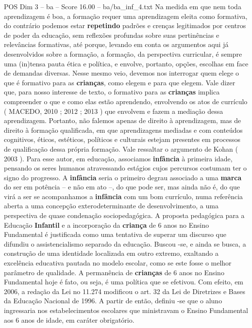 \begin{textsample}{POS Dim 3 – ba – Score 16.00 – ba/ba\_inf\_4.txt}
Na medida em que nem toda aprendizagem é boa, a formação requer uma aprendizagem eleita como formativa, do contrário podemos estar \textbf{repetindo} padrões e crenças legitimados por centros de poder da educação, sem reflexões profundas sobre suas pertinências e relevâncias formativas, até porque, levando em conta os argumentos aqui já desenvolvidos sobre a formação, a formação, da perspectiva curricular, é sempre uma (in)tensa pauta ética e política, e envolve, portanto, opções, escolhas em face de demandas diversas.
Nesse mesmo veio, devemos nos interrogar quem elege o que é formativo para as \textbf{crianças}, como elegem e para que elegem.
Vale dizer que, para nosso interesse de texto, o formativo para as \textbf{crianças} implica compreender o que e como elas estão aprendendo, envolvendo os atos de currículo ( MACEDO, 2010 ; 2012 ; 2013 ) que envolvem e fazem a mediação dessa aprendizagem.
Portanto, não falemos apenas de direito à aprendizagem, mas de direito à formação qualificada, em que aprendizagens mediadas e com conteúdos cognitivos, éticos, estéticos, políticos e culturais estejam presentes em processos de qualificação dessa própria formação.
Vale ressaltar o argumento de Kohan ( 2003 ).
Para esse autor, em educação, associamos \textbf{infância} à primeira idade, pensando os seres humanos atravessando estágios cujos percursos costumam ter o signo do progresso.
A \textbf{infância} seria o primeiro degrau associado a uma \textbf{marca} do ser em potência – e não em ato –, do que pode ser, mas ainda não é, do que virá a ser se acompanhamos a \textbf{infância} com um bom currículo, numa referência aberta a uma concepção exterodeterminante de desenvolvimento, a uma perspectiva de quase condenação sociopedagógica.
A proposta pedagógica para a Educação \textbf{Infantil} e a incorporação da \textbf{criança} de 6 anos no Ensino Fundamental é justificada como uma tentativa de superar um discurso que difundiu o assistencialismo separado da educação.
Buscou -se, e ainda se busca, a construção de uma identidade localizada em outro extremo, exaltando a excelência educativa pautada no modelo escolar, como se este fosse o melhor parâmetro de qualidade.
A permanência de \textbf{crianças} de 6 anos no Ensino Fundamental hoje é fato, ou seja, é uma política que se efetivou.
Com efeito, em 2006, a redação da Lei no 11.274 modificou o art. 32 da Lei de Diretrizes e Bases da Educação Nacional de 1996.
A partir de então, definiu -se que o aluno ingressaria nos estabelecimentos escolares que ministravam o Ensino Fundamental aos 6 anos de idade, em caráter obrigatório.

\end{textsample}
